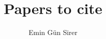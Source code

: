 \documentclass[10pt]{article}
\title{Papers to cite}
\author{Emin G\"un Sirer}
\date{}
\begin{document}
\maketitle

\cite{*}



\pagebreak
\end{document}
